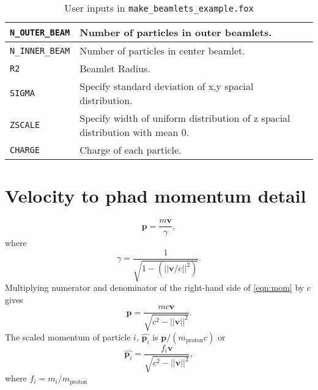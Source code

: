 \documentclass[12pt]{article}
\begin{document}
\begin{table}
\begin{tabular}{|l|p{4.25in}|}
\hline
\texttt{N{\_}OUTER{\_}BEAM} & Number of particles in outer beamlets.\\
\hline
\texttt{N{\_}INNER{\_}BEAM} & Number of particles in center beamlet.\\
\hline
\texttt{R2} & Beamlet Radius.\\
\hline
\texttt{SIGMA} & Specify standard deviation of x,y spacial distribution.\\
\hline
\texttt{ZSCALE} & Specify width of uniform distribution of z spacial distribution with mean $0$.\\
\hline
\texttt{CHARGE} & Charge of each particle.\\
\hline
\end{tabular}
\caption{User inputs in \texttt{make{\_}beamlets{\_}example.fox}}
\label{table:variables}
\end{table}






\section*{Velocity to phad momentum detail}

\begin{equation}
\mathbf{p}=\frac{m\mathbf{v}}{\gamma},
\label{eqn:mom}
\end{equation}
where
\[\gamma = \frac{1}{\sqrt{1-(||\mathbf{v}/c||^2)}}.\]
Multiplying numerator and denominator of the right-hand side of \eqref{eqn:mom} by $c$ gives
\[\mathbf{p}=\frac{mc \mathbf{v}}{\sqrt{c^2-||\mathbf{v}||^2}}.\]
The scaled momentum of particle $i$, $\hat{\mathbf{p}_i}$ is $\mathbf{p}/(m_{\text{proton}}c)$ or
\[\hat{\mathbf{p}_i}=\frac{f_i \mathbf{v}}{\sqrt{c^2-||\mathbf{v}||^2}},\]
where $f_i=m_i/m_{\text{proton}}$
\end{document}
